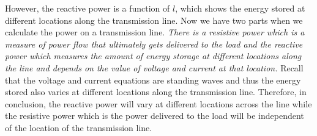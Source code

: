 However, the reactive power is a function of $l$, which shows the energy stored at different locations along the transmission line. Now we have two parts when we calculate the power on a transmission line. \emph{There is a resistive power which is a measure of power flow that ultimately gets delivered to the load and the reactive power which measures the amount of energy storage at different locations along the line and depends on the value of voltage and current at that location.} Recall that the voltage and current equations are standing waves and thus the energy stored also varies at different locations along the transmission line. Therefore, in conclusion, the reactive power will vary at different locations across the line while the resistive power which is the power delivered to the load will be independent of the location of the transmission line.
